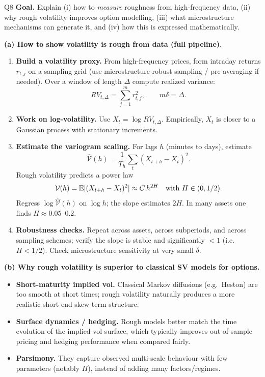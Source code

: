 \begin{solutionbox}{Q8}
\textbf{Goal.} Explain (i) how to \emph{measure} roughness from high-frequency data, (ii) why rough volatility improves option modelling, (iii) what microstructure mechanisms can generate it, and (iv) how this is expressed mathematically.

\medskip
\textbf{(a) How to show volatility is rough from data (full pipeline).}
\begin{enumerate}[leftmargin=*,label=\arabic*)]
  \item \textbf{Build a volatility proxy.} From high-frequency prices, form intraday returns \(r_{t,j}\) on a sampling grid (use microstructure-robust sampling / pre-averaging if needed). Over a window of length \(\Delta\) compute realized variance:
  \[
  RV_{t,\Delta}=\sum_{j=1}^{m} r_{t,j}^2,\qquad m\delta=\Delta.
  \]
  \item \textbf{Work on log-volatility.} Use \(X_t=\log RV_{t,\Delta}\). Empirically, \(X_t\) is closer to a Gaussian process with stationary increments.
  \item \textbf{Estimate the variogram scaling.} For lags \(h\) (minutes to days), estimate
  \[
  \widehat{\mathcal V}(h)=\frac{1}{T_h}\sum_{t} (X_{t+h}-X_t)^2.
  \]
  Rough volatility predicts a power law
  \[
  \mathcal V(h)=\mathbb{E}[(X_{t+h}-X_t)^2]\approx C\,h^{2H}\quad\text{with }H\in(0,1/2).
  \]
  Regress \(\log \widehat{\mathcal V}(h)\) on \(\log h\); the slope estimates \(2H\). In many assets one finds \(H\approx 0.05\)--\(0.2\).
  \item \textbf{Robustness checks.} Repeat across assets, across subperiods, and across sampling schemes; verify the slope is stable and significantly \(<1\) (i.e.\ \(H<1/2\)). Check microstructure sensitivity at very small \(\delta\).
\end{enumerate}

\medskip
\textbf{(b) Why rough volatility is superior to classical SV models for options.}
\begin{itemize}[leftmargin=*]
  \item \textbf{Short-maturity implied vol.} Classical Markov diffusions (e.g.\ Heston) are too smooth at short times; rough volatility naturally produces a more realistic short-end skew term structure.
  \item \textbf{Surface dynamics / hedging.} Rough models better match the time evolution of the implied-vol surface, which typically improves out-of-sample pricing and hedging performance when compared fairly.
  \item \textbf{Parsimony.} They capture observed multi-scale behaviour with few parameters (notably \(H\)), instead of adding many factors/regimes.
\end{itemize}


\end{solutionbox}
